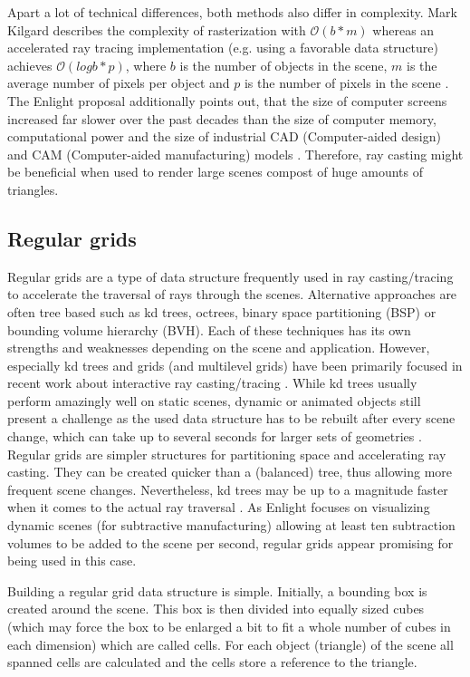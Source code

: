 Apart a lot of technical differences, both methods also differ in complexity. Mark Kilgard describes the complexity of rasterization with $\mathcal{O}(b * m)$ whereas an accelerated ray tracing implementation (e.g. using a favorable data structure) achieves $\mathcal{O}(log b * p)$, where $b$ is the number of objects in the scene, $m$ is the average number of pixels per object and $p$ is the number of pixels in the scene \cite[p.48]{ray_casting_presentation}. The Enlight proposal additionally points out, that the size of computer screens increased far slower over the past decades than the size of computer memory, computational power and the size of industrial CAD (Computer-aided design) and CAM (Computer-aided manufacturing) models \cite{enlight_proposal}. Therefore, ray casting might be beneficial when used to render large scenes compost of huge amounts of triangles.


\subsection{Regular grids}
\label{sec:regular_grids}

Regular grids are a type of data structure frequently used in ray casting/tracing to accelerate the traversal of rays through the scenes. Alternative approaches are often tree based such as kd trees, octrees, binary space partitioning (BSP) or bounding volume hierarchy (BVH). Each of these techniques has its own strengths and weaknesses depending on the scene and application. However, especially kd trees and grids (and multilevel grids) have been primarily focused in recent work about interactive ray casting/tracing \cite[ch.1]{packet_caster}. While kd trees usually perform amazingly well on static scenes, dynamic or animated objects still present a challenge as the used data structure has to be rebuilt after every scene change, which can take up to several seconds for larger sets of geometries \cite[ch.1]{packet_caster}. Regular grids are simpler structures for partitioning space and accelerating ray casting. They can be created quicker than a (balanced) tree, thus allowing more frequent scene changes. Nevertheless, kd trees may be up to a magnitude faster when it comes to the actual ray traversal \cite[ch.1]{packet_caster}. As Enlight focuses on visualizing dynamic scenes (for subtractive manufacturing) allowing at least ten subtraction volumes to be added to the scene per second, regular grids appear promising for being used in this case.

Building a regular grid data structure is simple. Initially, a bounding box is created around the scene. This box is then divided into equally sized cubes (which may force the box to be enlarged a bit to fit a whole number of cubes in each dimension) which are called cells. For each object (triangle) of the scene all spanned cells are calculated and the cells store a reference to the triangle.

